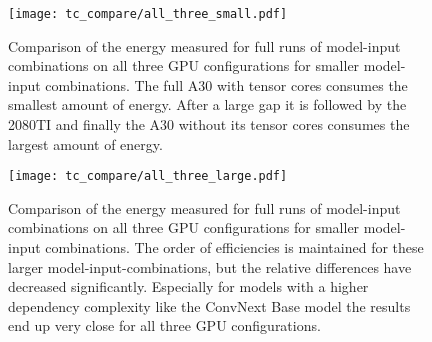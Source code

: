 \documentclass[conference]{IEEEtran}
\begin{document}
\begin{figure}
    \texttt{[image: tc\_compare/all\_three\_small.pdf]}
    \caption{Comparison of the energy measured for full runs of model-input combinations on all three GPU configurations for smaller model-input combinations. The full A30 with tensor cores consumes the smallest amount of energy. After a large gap it is followed by the 2080TI and finally the A30 without its tensor cores consumes the largest amount of energy.}
    \label{fig:tcnotcsmall}
    \vspace{0.2cm}
    \texttt{[image: tc\_compare/all\_three\_large.pdf]}
    \caption{Comparison of the energy measured for full runs of model-input combinations on all three GPU configurations for smaller model-input combinations. The order of efficiencies is maintained for these larger model-input-combinations, but the relative differences have decreased significantly. Especially for models with a higher dependency complexity like the ConvNext Base model the results end up very close for all three GPU configurations.}
    \label{fig:tcnotclarge}
\end{figure}
\end{document}
